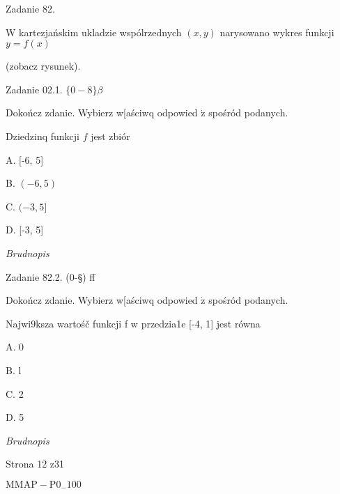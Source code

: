 \documentclass[a4paper,12pt]{article}
\begin{document}
Zadanie 82.

$\mathrm{W}$ kartezjańskim ukladzie wspólrzednych $(x,y)$ narysowano wykres funkcji $y=f(x)$

(zobacz rysunek).

Zadanie 02.1. $\{0-8\} \beta$

Dokończ zdanie. Wybierz w[aściwq odpowied $\acute{\mathrm{z}}$ spośród podanych.

Dziedzinq funkcji $f$ jest zbiór

A. [-6, 5]

B. $(-6,5)$

C. $(-3,5]$

D. [-3, 5]

{\it Brudnopis}

Zadanie 82.2. (0-\S) ff

Dokończ zdanie. Wybierz w[aściwq odpowied $\acute{\mathrm{z}}$ spośród podanych.

Najwi9ksza wartośč funkcji f w przedzia1e [-4, 1] jest równa

A. 0

B. l

C. 2

D. 5

{\it Brudnopis}

Strona 12 z31

$\mathrm{M}\mathrm{M}\mathrm{A}\mathrm{P}-\mathrm{P}0_{-}100$
\end{document}
